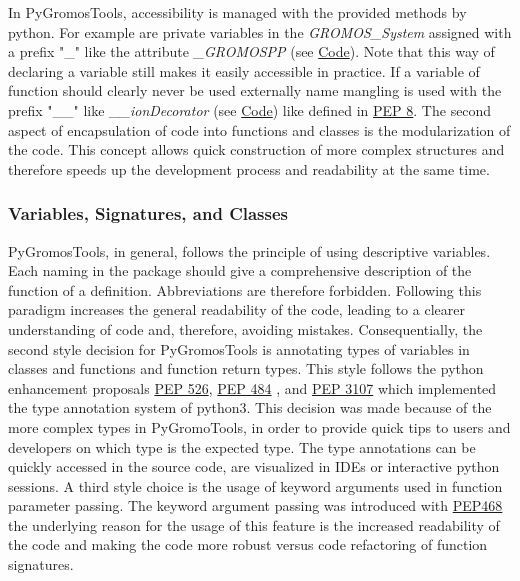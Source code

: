In PyGromosTools, accessibility is managed with the provided methods by python. For example are private variables in the \textit{GROMOS\_System} assigned with a prefix "\_" like the attribute \textit{\_GROMOSPP} (see  \hyperlink{https://github.com/rinikerlab/PyGromosTools/blob/348439a326357b8172717f5d5ed7a5bbfa4564ab/pyGROMOS/files/GROMOS\_system/GROMOS\_system.py\#L83}{Code}). Note that this way of declaring a variable still  makes it easily accessible in practice. If a variable of function should clearly never be used externally name mangling is used with the prefix "\_\_" like \textit{\_\_ionDecorator} (see  \hyperlink{https://github.com/rinikerlab/PyGromosTools/blob/348439a326357b8172717f5d5ed7a5bbfa4564ab/pyGROMOS/files/GROMOS\_system/GROMOS\_system.py\#L994}{Code}) like defined in \hyperlink{https://www.python.org/dev/peps/pep-0008/}{PEP 8}.
The second aspect of encapsulation of code into functions and classes is the modularization of the code. This concept allows quick construction of more complex structures and therefore speeds up the development process and readability at the same time. \cite{}

\subsubsection{Variables, Signatures, and Classes}
PyGromosTools, in general, follows the principle of using descriptive variables. Each naming in the package should give a comprehensive description of the function of a definition. Abbreviations are therefore forbidden. Following this paradigm increases the general readability of the code, leading to a clearer understanding of code and, therefore, avoiding mistakes. 
Consequentially, the second style decision for PyGromosTools is annotating types of variables in classes and functions and function return types. This style follows the python enhancement proposals  \hyperlink{https://www.python.org/dev/peps/pep-0526/}{PEP 526}, \hyperlink{https://www.python.org/dev/peps/pep-0484//}{PEP 484} , and  \hyperlink{https://www.python.org/dev/peps/pep-3107/}{PEP 3107} which implemented the type annotation system of python3. This decision was made because of the more complex types in PyGromoTools, in order to provide quick tips to users and developers on which type is the expected type. The type annotations can be quickly accessed in the source code, are visualized in IDEs or interactive python sessions. 
A third style choice is the usage of keyword arguments used in function parameter passing. The keyword argument passing was introduced with \hyperlink{https://www.python.org/dev/peps/pep-0468/}{PEP468} the underlying reason for the usage of this feature is the increased readability of the code and making the code more robust versus code refactoring of function signatures.

